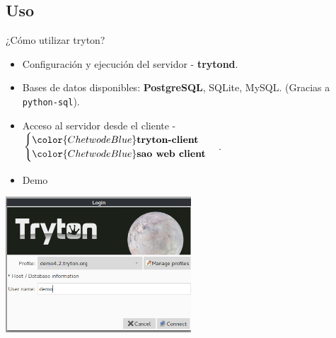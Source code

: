     \subsection{Uso}

	\begin{frame}[fragile=singleslide]{¿Cómo utilizar tryton?}
        \begin{itemize}
            \item Configuración y ejecución del servidor - {\color{ChetwodeBlue}\textbf{trytond}}.
            \item Bases de datos disponibles: \textbf{PostgreSQL}, SQLite, MySQL. (Gracias a \texttt{python-sql}).
            \item Acceso al servidor desde el cliente - $\begin{cases} {\color{ChetwodeBlue}\textbf{tryton-client}} \\ {\color{ChetwodeBlue}\textbf{sao web client}} \end{cases}$.
            \item Demo
        \end{itemize}
        \vspace*{-5mm}
        \begin{center}
            \includegraphics[width=0.52\textwidth]{./Images/demo.png}
        \end{center}
	\end{frame}

